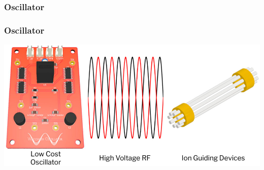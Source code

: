 \documentclass{presentation}
\begin{document}
\begin{frame}\frametitle{Oscillator}
\end{frame}

\begin{frame}\frametitle{Oscillator}
  \includegraphics[width=\textwidth]{"./oscillator.jpeg"}
\end{frame}
\end{document}
